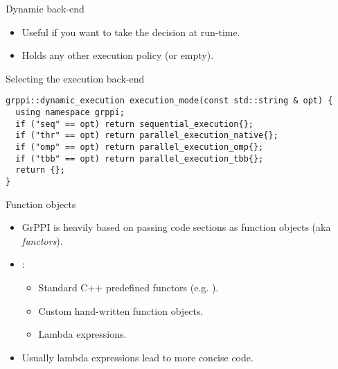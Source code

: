 \begin{frame}[t,fragile]{Dynamic back-end}
\begin{itemize}
  \item Useful if you want to take the decision at run-time.
  \item Holds any other execution policy (or empty).
\end{itemize}
\vfill\pause
\begin{block}{Selecting the execution back-end}
\begin{lstlisting}
grppi::dynamic_execution execution_mode(const std::string & opt) {
  using namespace grppi;
  if ("seq" == opt) return sequential_execution{};
  if ("thr" == opt) return parallel_execution_native{};
  if ("omp" == opt) return parallel_execution_omp{};
  if ("tbb" == opt) return parallel_execution_tbb{};
  return {};
}
\end{lstlisting}
\end{block}
\end{frame}

\begin{frame}[t]{Function objects}
\begin{itemize}
  \item GrPPI is heavily based on passing code sections as function objects
        (aka \emph{functors}).
  \vfill
  \item {}:
    \begin{itemize}
      \item Standard C++ predefined functors (e.g. ).
      \item Custom hand-written function objects.
      \item Lambda expressions.
    \end{itemize}
  \vfill
  \item Usually lambda expressions lead to more concise code.
\end{itemize}
\end{frame}

